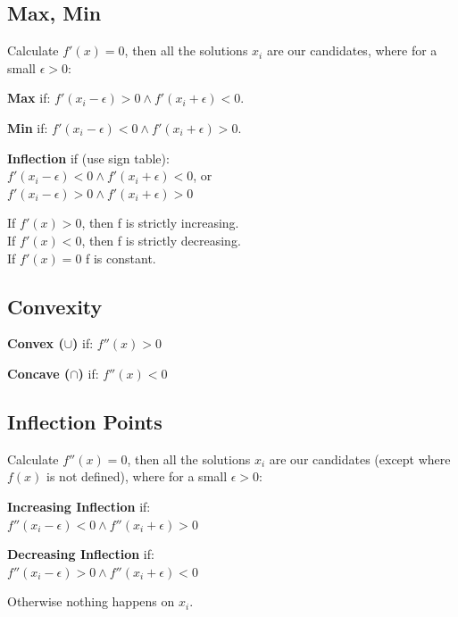 \documentclass[8pt,a4paper]{extarticle}     %
\theoremstyle{definition}
\theoremstyle{definition}
\theoremstyle{definition}
\begin{document}
\begin{multicols}{4}
\subsection{Max, Min}
Calculate $f'(x) = 0$, then all the solutions $x_i$ are our candidates, where for a small $\epsilon > 0$:
\begin{bulletlist}
	\item \textbf{Max} if: $f'(x_i-\epsilon) > 0 \land f'(x_i+\epsilon) < 0$. 
	\item \textbf{Min} if: $f'(x_i-\epsilon) < 0 \land f'(x_i+\epsilon) > 0$.  
	\item \textbf{Inflection} if (use sign table): \\
	$f'(x_i-\epsilon) < 0 \land f'(x_i+\epsilon) < 0$, or\\
	$f'(x_i-\epsilon) > 0 \land f'(x_i+\epsilon) > 0$
\end{bulletlist}
If $f'(x)>0$, then f is strictly increasing. \\
If $f'(x)<0$, then f is strictly decreasing. \\
If $f'(x)=0$ f is constant.

\subsection{Convexity}
\begin{bulletlist}
	\item \textbf{Convex ($\cup$)} if: $f''(x) > 0$
	\item \textbf{Concave ($\cap$)} if: $f''(x) < 0$
\end{bulletlist}

\subsection{Inflection Points}
Calculate $f''(x) = 0$, then all the solutions $x_i$ are our candidates (except where $f(x)$ is not defined), where for a small $\epsilon > 0$:
\begin{bulletlist}
	\item \textbf{Increasing Inflection} if: \\$f''(x_i-\epsilon) < 0 \land f''(x_i+\epsilon) > 0$ 
	\item \textbf{Decreasing Inflection} if: \\$f''(x_i-\epsilon) > 0 \land f''(x_i+\epsilon) < 0$
	\item Otherwise nothing happens on $x_i$.
\end{bulletlist}


\end{multicols}
\end{document}
